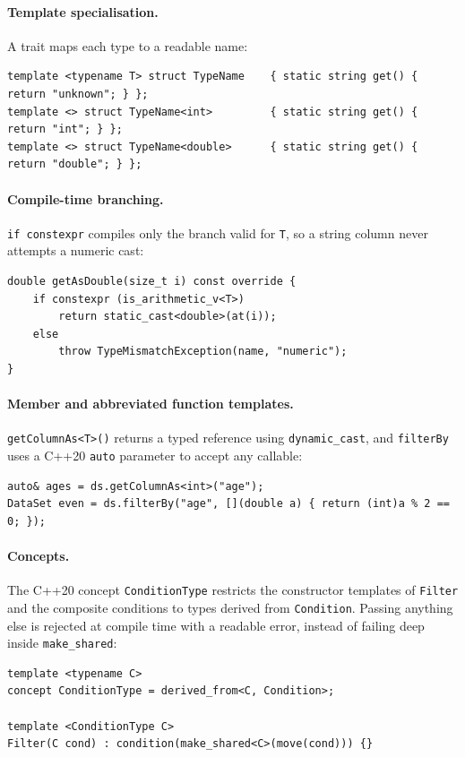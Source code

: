 \documentclass[11pt,a4paper]{article}
\newcommand{\code}[1]{\texttt{#1}}
\begin{document}
\paragraph{Template specialisation.} A trait maps each type to a readable name:
\begin{lstlisting}
template <typename T> struct TypeName    { static string get() { return "unknown"; } };
template <> struct TypeName<int>         { static string get() { return "int"; } };
template <> struct TypeName<double>      { static string get() { return "double"; } };
\end{lstlisting}

\paragraph{Compile-time branching.} \code{if constexpr} compiles only the branch valid for
\code{T}, so a string column never attempts a numeric cast:
\begin{lstlisting}
double getAsDouble(size_t i) const override {
    if constexpr (is_arithmetic_v<T>)
        return static_cast<double>(at(i));
    else
        throw TypeMismatchException(name, "numeric");
}
\end{lstlisting}

\paragraph{Member and abbreviated function templates.} \code{getColumnAs<T>()} returns a typed
reference using \code{dynamic\_cast}, and \code{filterBy} uses a C++20 \code{auto} parameter to
accept any callable:
\begin{lstlisting}
auto& ages = ds.getColumnAs<int>("age");
DataSet even = ds.filterBy("age", [](double a) { return (int)a % 2 == 0; });
\end{lstlisting}

\paragraph{Concepts.} The C++20 concept \code{ConditionType} restricts the constructor templates
of \code{Filter} and the composite conditions to types derived from \code{Condition}. Passing
anything else is rejected at compile time with a readable error, instead of failing deep inside
\code{make\_shared}:
\begin{lstlisting}
template <typename C>
concept ConditionType = derived_from<C, Condition>;

template <ConditionType C>
Filter(C cond) : condition(make_shared<C>(move(cond))) {}
\end{lstlisting}
\end{document}
